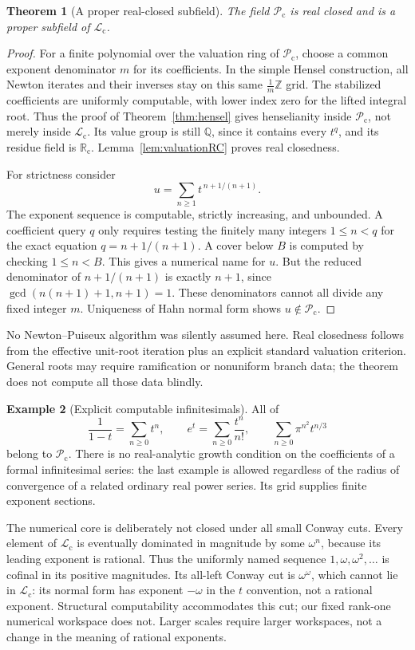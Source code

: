 \documentclass[11pt,letterpaper]{article}
\numberwithin{equation}{section}
\newtheorem{theorem}{Theorem}[section]
\theoremstyle{definition}
\newtheorem{example}[theorem]{Example}
\theoremstyle{remark}
\newcommand{\Rc}{\mathbb R_{\mathrm c}}
\newcommand{\Lc}{\mathcal L_{\mathrm c}}
\newcommand{\Pc}{\mathcal P_{\mathrm c}}
\newcommand{\Q}{\mathbb Q}
\newcommand{\Z}{\mathbb Z}
\begin{document}
\begin{theorem}[A proper real-closed subfield]
\label{thm:puiseuxclosed}
The field $\Pc$ is real closed and is a proper subfield of $\Lc$.
\end{theorem}
\begin{proof}
For a finite polynomial over the valuation ring of $\Pc$, choose a common
exponent denominator $m$ for its coefficients. In the simple Hensel
construction, all Newton iterates and their inverses stay on this same
$\frac1m\Z$ grid. The stabilized coefficients are uniformly computable,
with lower index zero for the lifted integral root. Thus the proof of
Theorem~\ref{thm:hensel} gives henselianity inside $\Pc$, not merely inside
$\Lc$. Its value group is still $\Q$, since it contains every $t^q$, and
its residue field is $\Rc$. Lemma~\ref{lem:valuationRC} proves real
closedness.

For strictness consider
\begin{equation}\label{eq:unboundeddenoms}
 u=\sum_{n\ge1}t^{\,n+1/(n+1)}.
\end{equation}
The exponent sequence is computable, strictly increasing, and unbounded.
A coefficient query $q$ only requires testing the finitely many integers
$1\le n<q$ for the exact equation $q=n+1/(n+1)$. A cover below $B$ is
computed by checking $1\le n<B$. This gives a numerical name for $u$.
But the reduced denominator of $n+1/(n+1)$ is exactly $n+1$, since
$\gcd(n(n+1)+1,n+1)=1$. These denominators cannot all divide any fixed
integer $m$. Uniqueness of Hahn normal form shows $u\notin\Pc$.
\end{proof}

No Newton--Puiseux algorithm was silently assumed here. Real closedness
follows from the effective unit-root iteration plus an explicit standard
valuation criterion. General roots may require ramification or nonuniform
branch data; the theorem does not compute all those data blindly.

\begin{example}[Explicit computable infinitesimals]
All of
\[
 \frac{1}{1-t}=\sum_{n\ge0}t^n,\qquad
 e^t=\sum_{n\ge0}\frac{t^n}{n!},\qquad
 \sum_{n\ge0}\pi^{n^2}t^{n/3}
\]
belong to $\Pc$. There is no real-analytic growth condition on the
coefficients of a formal infinitesimal series: the last example is allowed
regardless of the radius of convergence of a related ordinary real power
series. Its grid supplies finite exponent sections.
\end{example}

The numerical core is deliberately not closed under all small Conway
cuts. Every element of $\Lc$ is eventually dominated in magnitude by some
$\omega^n$, because its leading exponent is rational. Thus the uniformly
named sequence $1,\omega,\omega^2,\ldots$ is cofinal in its positive
magnitudes. Its all-left Conway cut is $\omega^\omega$, which cannot lie
in $\Lc$: its normal form has exponent $-\omega$ in the $t$ convention,
not a rational exponent. Structural computability accommodates this cut;
our fixed rank-one numerical workspace does not. Larger scales require
larger workspaces, not a change in the meaning of rational exponents.
\end{document}
